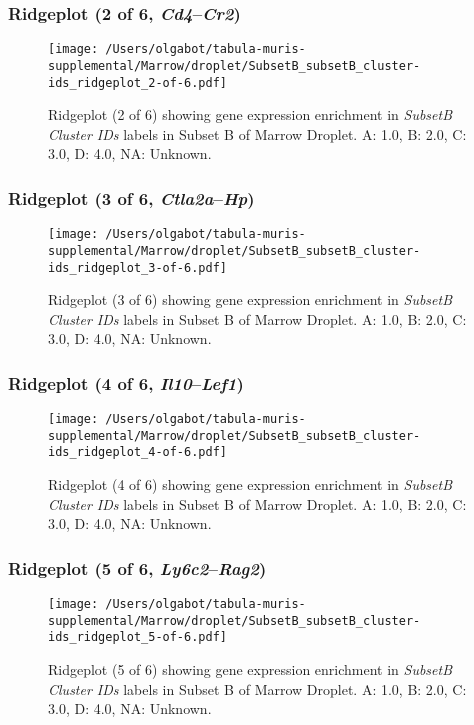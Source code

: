 \clearpage

\subsubsection{Ridgeplot (2 of 6, \emph{Cd4}--\emph{Cr2})}
\begin{figure}[h]
\centering
\texttt{[image: /Users/olgabot/tabula-muris-supplemental/Marrow/droplet/SubsetB\_subsetB\_cluster-ids\_ridgeplot\_2-of-6.pdf]}

\caption{ Ridgeplot (2 of 6)  showing gene expression enrichment in \emph{SubsetB Cluster IDs} labels in Subset B of Marrow Droplet. A: 1.0, B: 2.0, C: 3.0, D: 4.0, NA: Unknown.}
\end{figure}


\clearpage

\subsubsection{Ridgeplot (3 of 6, \emph{Ctla2a}--\emph{Hp})}
\begin{figure}[h]
\centering
\texttt{[image: /Users/olgabot/tabula-muris-supplemental/Marrow/droplet/SubsetB\_subsetB\_cluster-ids\_ridgeplot\_3-of-6.pdf]}

\caption{ Ridgeplot (3 of 6)  showing gene expression enrichment in \emph{SubsetB Cluster IDs} labels in Subset B of Marrow Droplet. A: 1.0, B: 2.0, C: 3.0, D: 4.0, NA: Unknown.}
\end{figure}


\clearpage

\subsubsection{Ridgeplot (4 of 6, \emph{Il10}--\emph{Lef1})}
\begin{figure}[h]
\centering
\texttt{[image: /Users/olgabot/tabula-muris-supplemental/Marrow/droplet/SubsetB\_subsetB\_cluster-ids\_ridgeplot\_4-of-6.pdf]}

\caption{ Ridgeplot (4 of 6)  showing gene expression enrichment in \emph{SubsetB Cluster IDs} labels in Subset B of Marrow Droplet. A: 1.0, B: 2.0, C: 3.0, D: 4.0, NA: Unknown.}
\end{figure}


\clearpage

\subsubsection{Ridgeplot (5 of 6, \emph{Ly6c2}--\emph{Rag2})}
\begin{figure}[h]
\centering
\texttt{[image: /Users/olgabot/tabula-muris-supplemental/Marrow/droplet/SubsetB\_subsetB\_cluster-ids\_ridgeplot\_5-of-6.pdf]}

\caption{ Ridgeplot (5 of 6)  showing gene expression enrichment in \emph{SubsetB Cluster IDs} labels in Subset B of Marrow Droplet. A: 1.0, B: 2.0, C: 3.0, D: 4.0, NA: Unknown.}
\end{figure}


